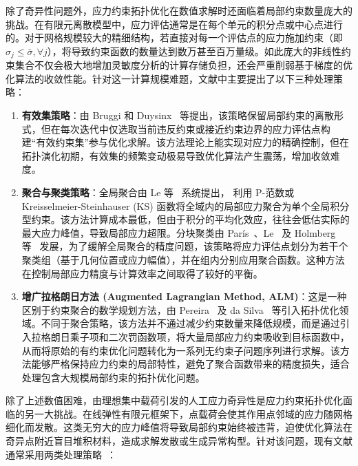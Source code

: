 除了奇异性问题外，应力约束拓扑优化在数值求解时还面临着局部约束数量庞大的挑战。在有限元离散模型中，应力评估通常是在每个单元的积分点或中心点进行的。对于网格规模较大的精细结构，若直接对每一个评估点的应力施加约束（即 $\sigma_{j} \le \bar{\sigma}, \forall j$），将导致约束函数的数量达到数万甚至百万量级。如此庞大的非线性约束集合不仅会极大地增加灵敏度分析的计算存储负担，还会严重削弱基于梯度的优化算法的收敛性能。针对这一计算规模难题，文献中主要提出了以下三种处理策略：

\begin{enumerate}
	\item \textbf{有效集策略}：由 Bruggi 和 Duysinx~\cite{bruggiTopologyOptimizationMinimum2012} 等提出，该策略保留局部约束的离散形式，但在每次迭代中仅选取当前违反约束或接近约束边界的应力评估点构建“有效约束集”参与优化求解。该方法理论上能实现对应力的精确控制，但在拓扑演化初期，有效集的频繁变动极易导致优化算法产生震荡，增加收敛难度。
	
	\item \textbf{聚合与聚类策略}：全局聚合由 Le 等~\cite{leStressbasedTopologyOptimization2010b} 系统提出，
	利用 P-范数或 Kreisselmeier-Steinhauser (KS) 函数将全域内的局部应力聚合为单个全局积分型约束。该方法计算成本最低，但由于积分的平均化效应，往往会低估实际的最大应力峰值，导致局部应力超限。分块聚类由 París~\cite{parisBlockAggregationStress2010}、Le~\cite{leStressbasedTopologyOptimization2010b} 及 Holmberg 等~\cite{holmbergStressConstrainedTopology2013a} 发展，为了缓解全局聚合的精度问题，该策略将应力评估点划分为若干个聚类组（基于几何位置或应力幅值），并在组内分别应用聚合函数。这种方法在控制局部应力精度与计算效率之间取得了较好的平衡。
	
	\item \textbf{增广拉格朗日方法 (Augmented Lagrangian Method, ALM)}：这是一种区别于约束聚合的数学规划方法，由 Pereira~\cite{pereiraTopologyOptimizationContinuum2004} 及 da Silva~\cite{dasilvaTopologyOptimizationContinuum2018} 等引入拓扑优化领域。不同于聚合策略，该方法并不通过减少约束数量来降低规模，而是通过引入拉格朗日乘子项和二次罚函数项，将大量局部应力约束吸收到目标函数中，从而将原始的有约束优化问题转化为一系列无约束子问题序列进行求解。该方法能够严格保持应力约束的局部特性，避免了聚合函数带来的精度损失，适合处理包含大规模局部约束的拓扑优化问题。
\end{enumerate}

除了上述数值困难，由理想集中载荷引发的人工应力奇异性是应力约束拓扑优化面临的另一大挑战。在线弹性有限元框架下，点载荷会使其作用点邻域的应力随网格细化而发散。这类无穷大的应力峰值将导致局部约束始终被违背，迫使优化算法在奇异点附近盲目堆积材料，造成求解发散或生成异常构型。针对该问题，现有文献通常采用两类处理策略~\cite{holmbergStressConstrainedTopology2013a, giraldo-londonoPolyStressMatlabImplementation2021}：

